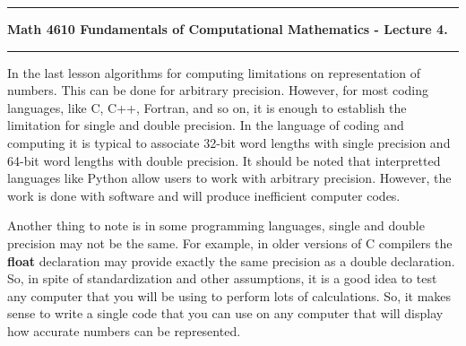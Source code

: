 \documentclass[10pt,fleqn]{article}
\begin{document}
\vskip0.1in\hrule\vskip0.1in
\noindent
{\bf Math 4610 Fundamentals of Computational Mathematics  - Lecture 4.} 
\vskip0.1in\hrule\vskip0.1in
\noindent
In the last lesson algorithms for computing limitations on representation of
numbers. This can be done for arbitrary precision. However, for most coding
languages, like C, C++, Fortran, and so on, it is enough to establish the
limitation for single and double precision. In the language of coding and
computing it is typical to associate 32-bit word lengths with single precision
and 64-bit word lengths with double precision. It should be noted that
interpretted languages like Python allow users to work with arbitrary precision.
However, the work is done with software and will produce inefficient computer
codes.

Another thing to note is in some programming languages, single and double
precision may not be the same. For example, in older versions of C compilers
the {\bf float} declaration may provide exactly the same precision as a double
declaration. So, in spite of standardization and other assumptions, it is a
good idea to test any computer that you will be using to perform lots of
calculations. So, it makes sense to write a single code that you can use on any
computer that will display how accurate numbers can be represented.
\end{document}
